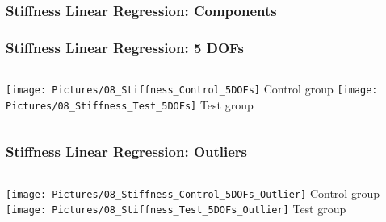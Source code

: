 \documentclass[xcolor=table]{beamer}
\begin{document}
\begin{frame}
	\frametitle{Stiffness Linear Regression: Components}
	\begin{figure}
		\captionsetup[subfigure]{labelformat=empty}
		\qquad
		\qquad
	\end{figure}
\end{frame}


\begin{frame}
	\frametitle{Stiffness Linear Regression: 5 DOFs}
	\begin{columns}[c]
		\centering
		\vfill		
		\texttt{[image: Pictures/08\_Stiffness\_Control\_5DOFs]}
		Control group
		\vfill
		\centering
		\vfill
		\texttt{[image: Pictures/08\_Stiffness\_Test\_5DOFs]}
		Test group
		\vfill
	\end{columns}
\end{frame}


\begin{frame}
	\frametitle{Stiffness Linear Regression: Outliers}
	\begin{columns}[c]
		\centering
		\vfill		
		\texttt{[image: Pictures/08\_Stiffness\_Control\_5DOFs\_Outlier]}
		Control group
		\vfill
		\centering
		\vfill
		\texttt{[image: Pictures/08\_Stiffness\_Test\_5DOFs\_Outlier]}
		Test group
		\vfill
	\end{columns}
\end{frame}

\end{document}
